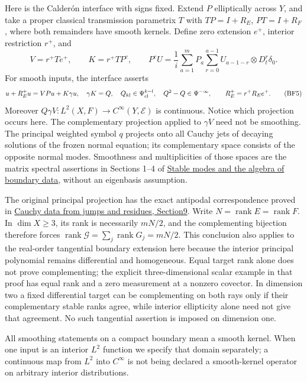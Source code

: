\documentclass[
  11pt,
]{article}
\begin{document}
Here is the Calderón interface with signs fixed. Extend \(P\)
elliptically across \(Y\), and take a proper classical transmission
parametrix \(T\) with \(TP=I+R_E\), \(PT=I+R_F\), where both remainders
have smooth kernels. Define zero extension \(e^+\), interior restriction
\(r^+\), and \[
 V=r^+Te^+,\qquad K=r^+TP^c,\qquad
 P^cU=\frac1i\sum_{a=1}^m P_a\sum_{r=0}^{a-1}
             U_{a-1-r}\otimes D_t^r\delta_0.
 \tag{BF4}
\] For smooth inputs, the interface asserts \[
 u+R_E^+u=VPu+K\gamma u,\quad
 \gamma K=Q,\quad Q_{kl}\in\Psi^{k-l}_{\rm cl},\quad
 Q^2-Q\in\Psi^{-\infty},\qquad R_E^+=r^+R_Ee^+.
 \tag{BF5}
\] Moreover \(Q\gamma V:L^2(X,F)\to C^\infty(Y,\mathcal E)\) is
continuous. Notice which projection occurs here. The complementary
projection applied to \(\gamma V\) need not be smoothing. The principal
weighted symbol \(q\) projects onto all Cauchy jets of decaying
solutions of the frozen normal equation; its complementary space
consists of the opposite normal modes. Smoothness and multiplicities of
those spaces are the matrix spectral assertions in Sections 1--4 of
\href{stable-boundary-models.pdf}{Stable modes and the algebra of
boundary data}, without an eigenbasis assumption.

The original principal projection has the exact antipodal correspondence
proved in \href{calderon-cauchy-data.pdf}{Cauchy data from
jumps and residues, Section9}. Write
\(N=\operatorname{rank}E=\operatorname{rank}F\). In \(\dim X\geq3\), its
rank is necessarily \(mN/2\), and the complementing bijection therefore
forces
\(\operatorname{rank}\mathcal G=\sum_j\operatorname{rank}G_j=mN/2\).
This conclusion also applies to the real-order tangential boundary
extension here because the interior principal polynomial remains
differential and homogeneous. Equal target rank alone does not prove
complementing; the explicit three-dimensional scalar example in that
proof has equal rank and a zero measurement at a nonzero covector. In
dimension two a fixed differential target can be complementing on both
rays only if their complementary stable ranks agree, while interior
ellipticity alone need not give that agreement. No such tangential
assertion is imposed on dimension one.

All smoothing statements on a compact boundary mean a smooth kernel.
When one input is an interior \(L^2\) function we specify that domain
separately; a continuous map from \(L^2\) into \(C^\infty\) is not being
declared a smooth-kernel operator on arbitrary interior distributions.
\end{document}

